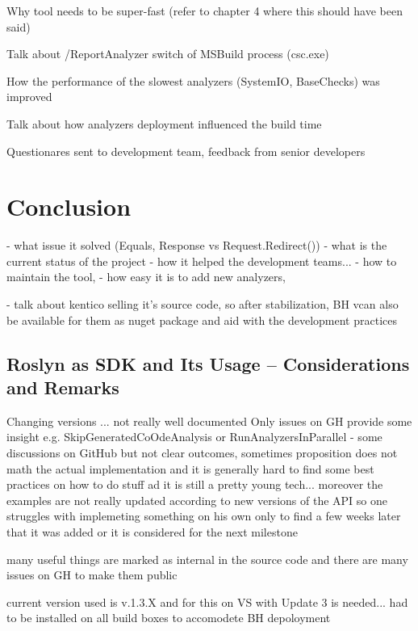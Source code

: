 \documentclass[
  digital, %
  table,   %
  lof,     %
  lot,     %
  oneside,
]{fithesis3}
\begin{document}
Why tool needs to be super-fast (refer to chapter 4 where this should have been said)

Talk about /ReportAnalyzer switch of MSBuild process (csc.exe)

How the performance of the slowest analyzers (SystemIO, BaseChecks) was improved

Talk about how analyzers deployment influenced the build time

Questionares sent to development team, feedback from senior developers

\chapter{Conclusion}
  - what issue it solved (Equals, Response vs Request.Redirect())
  - what is the current status of the project
  - how it helped the development teams...
  - how to maintain the tool, 
  - how easy it is to add new analyzers, 

- talk about kentico selling it's source code, so after stabilization, BH vcan also be available for them as nuget package and aid with the development practices 

\section{Roslyn as SDK and Its Usage -- Considerations and Remarks}
Changing versions ... not really well documented
Only issues on GH provide some insight
e.g. SkipGeneratedCoOdeAnalysis or RunAnalyzersInParallel - some discussions on GitHub but not clear outcomes, sometimes proposition does not math the actual implementation and it is generally hard to find some best practices on how to do stuff ad it is still a pretty young tech... moreover the examples are not really updated according to new versions of the API so one struggles with implemeting something on his own only to find a few weeks later that it was added or it is considered for the next milestone

many useful things are marked as internal in the source code and there are many issues on GH to make them public

current version used is v.1.3.X and for this on VS with Update 3 is needed... had to be installed on all build boxes to accomodete BH depoloyment
\end{document}
